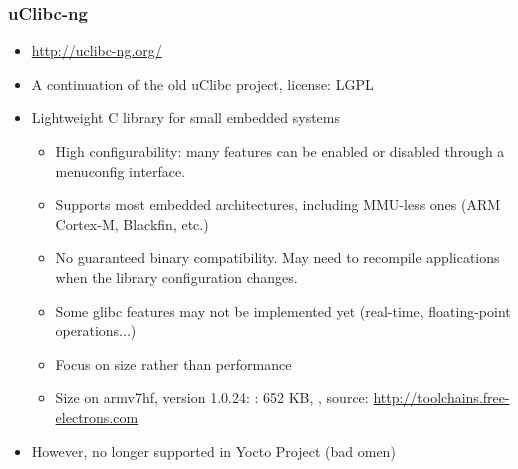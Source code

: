 \begin{frame}
  \frametitle{uClibc-ng}
  \begin{itemize}
  \item \url{http://uclibc-ng.org/}
  \item A continuation of the old uClibc project, license: LGPL
  \item Lightweight C library for small embedded systems
    \begin{itemize}
    \item High configurability: many features can be enabled or
      disabled through a menuconfig interface.
    \item Supports most embedded architectures, including MMU-less
          ones (ARM Cortex-M, Blackfin, etc.)
    \item No guaranteed binary compatibility. May need to
      recompile applications when the library configuration changes.
    \item Some glibc features may not be implemented yet (real-time,
          floating-point operations...)
    \item Focus on size rather than performance
    \item Size on armv7hf, version 1.0.24:
      : 652 KB, , source: \url{http://toolchains.free-electrons.com}
    \end{itemize}
    \item However, no longer supported in Yocto Project (bad omen)
  \end{itemize}
\end{frame}

